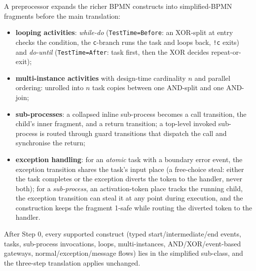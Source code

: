 A preprocessor expands the richer BPMN constructs into simplified-BPMN fragments before the main translation:
\begin{itemize}
  \item \textbf{looping activities}: \emph{while-do} (\texttt{TestTime=Before}: an XOR-split at entry checks the condition, the \texttt{c}-branch runs the task and loops back, \texttt{!c} exits) and \emph{do-until} (\texttt{TestTime=After}: task first, then the XOR decides repeat-or-exit);
  \item \textbf{multi-instance activities} with design-time cardinality $n$ and parallel ordering: unrolled into $n$ task copies between one AND-split and one AND-join;
  \item \textbf{sub-processes}: a collapsed inline sub-process becomes a call transition, the child's inner fragment, and a return transition; a top-level invoked sub-process is routed through guard transitions that dispatch the call and synchronise the return;
  \item \textbf{exception handling}: for an \emph{atomic} task with a boundary error event, the exception transition shares the task's input place (a free-choice steal: either the task completes or the exception diverts the token to the handler, never both); for a \emph{sub-process}, an activation-token place tracks the running child, the exception transition can steal it at any point during execution, and the construction keeps the fragment 1-safe while routing the diverted token to the handler.
\end{itemize}
After Step 0, every supported construct (typed start/intermediate/end events, tasks, sub-process invocations, loops, multi-instances, AND/XOR/event-based gateways, normal/exception/message flows) lies in the simplified sub-class, and the three-step translation applies unchanged.
